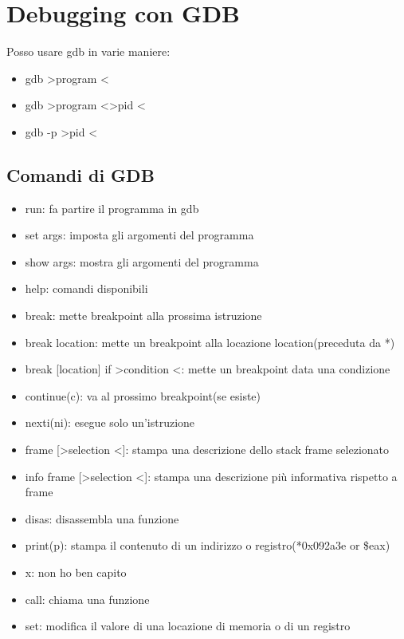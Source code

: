 \documentclass[oneside,a4paper,11pt]{book}
\theoremstyle{italicstyle}
\theoremstyle{normStyle}
\begin{document}
\section{Debugging con GDB}
Posso usare gdb in varie maniere:
\begin{itemize}
\item gdb \textgreater program \textless
\item gdb \textgreater program \textless \textgreater pid \textless 
\item gdb  -p \textgreater pid \textless
\end{itemize}

\subsection{Comandi di GDB}
\begin{itemize}
\item run: fa partire il programma in gdb
\item set args: imposta gli argomenti del programma
\item show args: mostra gli argomenti del programma
\item help: comandi disponibili
\item break: mette breakpoint alla prossima istruzione
\item break location: mette un breakpoint alla locazione location(preceduta da *)
\item break [location] if \textgreater condition \textless: mette un breakpoint data una condizione
\item continue(c): va al prossimo breakpoint(se esiste)
\item nexti(ni): esegue solo un'istruzione
\item frame [\textgreater selection \textless]: stampa una descrizione dello stack frame selezionato
\item info frame [\textgreater selection \textless]: stampa una descrizione più informativa rispetto a frame
\item disas: disassembla una funzione
\item print(p): stampa il contenuto di un indirizzo o registro(*0x092a3e or \$eax)  
\item x: non ho ben capito
\item call: chiama una funzione 
\item set: modifica il valore di una locazione di memoria o di un registro

\end{itemize}
\end{document}
